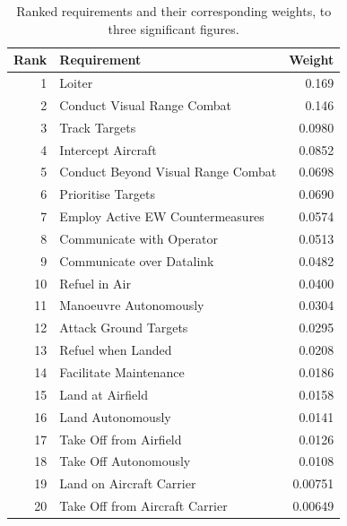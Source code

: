 \documentclass[../main.tex]{subfiles}
\begin{document}
\begin{table}[htbp]
    \centering
        \begin{tabular}{r l r}
            \hline
            \textbf{Rank} & \textbf{Requirement} & \textbf{Weight} \\
            \hline
            1  & Loiter                              & 0.169 \\
            2  & Conduct Visual Range Combat         & 0.146 \\
            3  & Track Targets                       & 0.0980 \\
            4  & Intercept Aircraft                  & 0.0852 \\
            5  & Conduct Beyond Visual Range Combat  & 0.0698 \\
            6  & Prioritise Targets                  & 0.0690 \\
            7  & Employ Active EW Countermeasures    & 0.0574 \\
            8  & Communicate with Operator           & 0.0513 \\
            9  & Communicate over Datalink           & 0.0482 \\
            10 & Refuel in Air                       & 0.0400 \\
            11 & Manoeuvre Autonomously              & 0.0304 \\
            12 & Attack Ground Targets               & 0.0295 \\
            13 & Refuel when Landed                  & 0.0208 \\
            14 & Facilitate Maintenance              & 0.0186 \\
            15 & Land at Airfield                    & 0.0158 \\
            16 & Land Autonomously                   & 0.0141 \\
            17 & Take Off from Airfield              & 0.0126 \\
            18 & Take Off Autonomously               & 0.0108 \\
            19 & Land on Aircraft Carrier             & 0.00751 \\
            20 & Take Off from Aircraft Carrier      & 0.00649 \\
            \hline
        \end{tabular}
        \caption{Ranked requirements and their corresponding weights, to three significant figures.}
        \label{tab:ranked_requirements}
\end{table}
\end{document}
